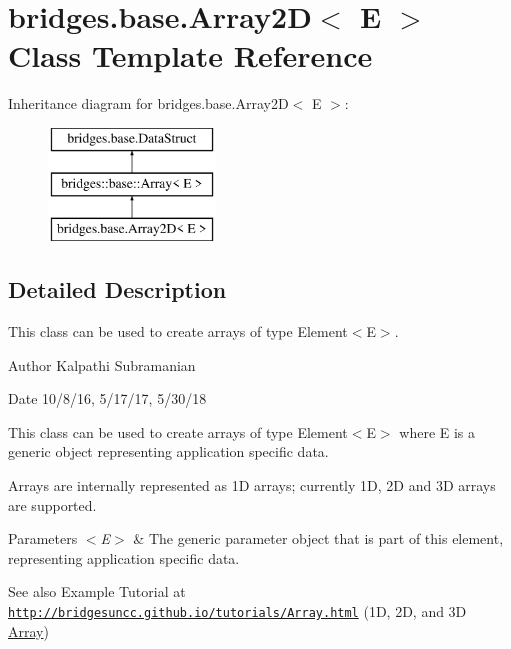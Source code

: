 \hypertarget{classbridges_1_1base_1_1_array2_d}{}\section{bridges.\+base.\+Array2D$<$ E $>$ Class Template Reference}
\label{classbridges_1_1base_1_1_array2_d}
Inheritance diagram for bridges.\+base.\+Array2D$<$ E $>$\+:\begin{figure}[H]
\begin{center}
\leavevmode
\includegraphics[height=3.000000cm]{classbridges_1_1base_1_1_array2_d}
\end{center}
\end{figure}


\subsection{Detailed Description}
This class can be used to create arrays of type Element$<$\+E$>$. 

\begin{DoxyAuthor}{Author}
Kalpathi Subramanian
\end{DoxyAuthor}
\begin{DoxyDate}{Date}
10/8/16, 5/17/17, 5/30/18
\end{DoxyDate}
This class can be used to create arrays of type Element$<$\+E$>$ where E is a generic object representing application specific data.

Arrays are internally represented as 1D arrays; currently 1D, 2D and 3D arrays are supported.


\begin{DoxyParams}{Parameters}
{\em $<$\+E$>$} & The generic parameter object that is part of this element, representing application specific data.\\
\hline
\end{DoxyParams}
\begin{DoxySeeAlso}{See also}
Example Tutorial at ~\newline
 \href{http://bridgesuncc.github.io/tutorials/Array.html}{\tt http\+://bridgesuncc.\+github.\+io/tutorials/\+Array.\+html} (1D, 2D, and 3D \hyperlink{classbridges_1_1base_1_1_array}{Array})~\newline
 
\end{DoxySeeAlso}
